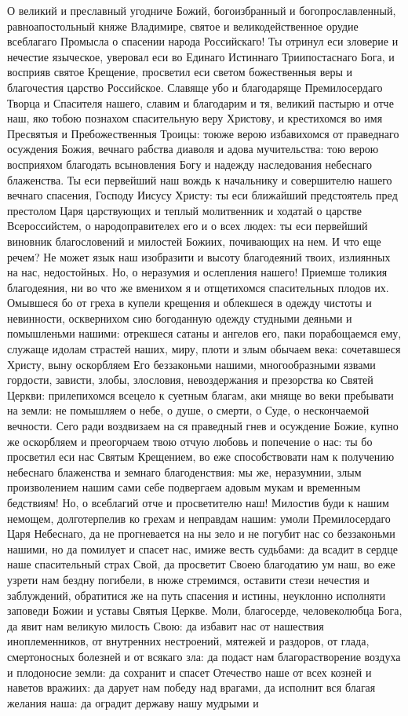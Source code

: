 О великий и преславный угодниче Божий, богоизбранный и богопрославленный, равноапостольный княже Владимире, святое и великодейственное орудие всеблагаго Промысла о спасении народа Российскаго! Ты отринул еси зловерие и нечестие языческое, уверовал еси во Единаго Истиннаго Триипостаснаго Бога, и восприяв святое Крещение, просветил еси светом божественныя веры и благочестия царство Российское. Славяще убо и благодаряще Премилосердаго Творца и Спасителя нашего, славим и благодарим и тя, великий пастырю и отче наш, яко тобою познахом спасительную веру Христову, и крестихомся во имя Пресвятыя и Пребожественныя Троицы: тоюже верою избавихомся от праведнаго осуждения Божия, вечнаго рабства диаволя и адова мучительства: тою верою восприяхом благодать всыновления Богу и надежду наследования небеснаго блаженства. Ты еси первейший наш вождь к начальнику и совершителю нашего вечнаго спасения, Господу Иисусу Христу: ты еси ближайший предстоятель пред престолом Царя царствующих и теплый молитвенник и ходатай о царстве Всероссийстем, о народоправителех его и о всех людех: ты еси первейший виновник благословений и милостей Божиих, почивающих на нем. И что еще речем? Не может язык наш изобразити и высоту благодеяний твоих, излиянных на нас, недостойных. Но, о неразумия и ослепления нашего! Приемше толикия благодеяния, ни во что же вменихом я и отщетихомся спасительных плодов их. Омывшеся бо от греха в купели крещения и облекшеся в одежду чистоты и невинности, осквернихом сию богоданную одежду студными деяньми и помышленьми нашими: отрекшеся сатаны и ангелов его, паки порабощаемся ему, служаще идолам страстей наших, миру, плоти и злым обычаем века: сочетавшеся Христу, выну оскорбляем Его беззаконьми нашими, многообразными язвами гордости, зависти, злобы, злословия, невоздержания и презорства ко Святей Церкви: прилепихомся всецело к суетным благам, аки мняще во веки пребывати на земли: не помышляем о небе, о душе, о смерти, о Суде, о нескончаемой вечности. Сего ради воздвизаем на ся праведный гнев и осуждение Божие, купно же оскорбляем и преогорчаем твою отчую любовь и попечение о нас: ты бо просветил еси нас Святым Крещением, во еже способствовати нам к получению небеснаго блаженства и земнаго благоденствия: мы же, неразумнии, злым произволением нашим сами себе подвергаем адовым мукам и временным бедствиям! Но, о всеблагий отче и просветителю наш! Милостив буди к нашим немощем, долготерпелив ко грехам и неправдам нашим: умоли Премилосердаго Царя Небеснаго, да не прогневается на ны зело и не погубит нас со беззаконьми нашими, но да помилует и спасет нас, имиже весть судьбами: да всадит в сердце наше спасительный страх Свой, да просветит Своею благодатию ум наш, во еже узрети нам бездну погибели, в нюже стремимся, оставити стези нечестия и заблуждений, обратитися же на путь спасения и истины, неуклонно исполняти заповеди Божии и уставы Святыя Церкве. Моли, благосерде, человеколюбца Бога, да явит нам великую милость Свою: да избавит нас от нашествия иноплеменников, от внутренних нестроений, мятежей и раздоров, от глада, смертоносных болезней и от всякаго зла: да подаст нам благорастворение воздуха и плодоносие земли: да сохранит и спасет Отечество наше от всех козней и наветов вражиих: да дарует нам победу над врагами, да исполнит вся благая желания наша: да оградит державу нашу мудрыми и 